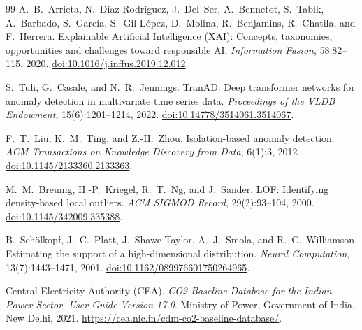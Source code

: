 \documentclass[11pt,a4paper,twoside]{article}
\begin{document}
\begin{thebibliography}{99}
A.~B.~Arrieta, N.~D{\'i}az-Rodr{\'i}guez, J.~Del~Ser, A.~Bennetot, S.~Tabik, A.~Barbado, S.~Garc{\'i}a, S.~Gil-L{\'o}pez, D.~Molina, R.~Benjamins, R.~Chatila, and F.~Herrera. Explainable Artificial Intelligence (XAI): Concepts, taxonomies, opportunities and challenges toward responsible AI. \emph{Information Fusion}, 58:82--115, 2020.
\href{https://doi.org/10.1016/j.inffus.2019.12.012}{doi:10.1016/j.inffus.2019.12.012}.

S.~Tuli, G.~Casale, and N.~R.~Jennings. TranAD: Deep transformer networks for anomaly detection in multivariate time series data. \emph{Proceedings of the VLDB Endowment}, 15(6):1201--1214, 2022.
\href{https://doi.org/10.14778/3514061.3514067}{doi:10.14778/3514061.3514067}.

F.~T.~Liu, K.~M.~Ting, and Z.-H.~Zhou. Isolation-based anomaly detection. \emph{ACM Transactions on Knowledge Discovery from Data}, 6(1):3, 2012.
\href{https://doi.org/10.1145/2133360.2133363}{doi:10.1145/2133360.2133363}.

M.~M.~Breunig, H.-P.~Kriegel, R.~T.~Ng, and J.~Sander. LOF: Identifying density-based local outliers. \emph{ACM SIGMOD Record}, 29(2):93--104, 2000.
\href{https://doi.org/10.1145/342009.335388}{doi:10.1145/342009.335388}.

B.~Sch{\"o}lkopf, J.~C.~Platt, J.~Shawe-Taylor, A.~J.~Smola, and R.~C.~Williamson. Estimating the support of a high-dimensional distribution. \emph{Neural Computation}, 13(7):1443--1471, 2001.
\href{https://doi.org/10.1162/089976601750264965}{doi:10.1162/089976601750264965}.

Central Electricity Authority (CEA). \emph{CO2 Baseline Database for the Indian Power Sector, User Guide Version 17.0}. Ministry of Power, Government of India, New Delhi, 2021.
\href{https://cea.nic.in/cdm-co2-baseline-database/}{https://cea.nic.in/cdm-co2-baseline-database/}.

\end{thebibliography}
\endgroup
\end{document}
